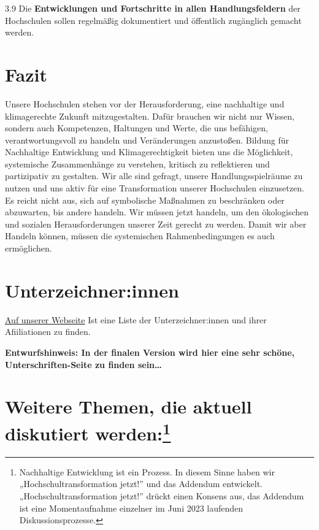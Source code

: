 \documentclass[DIV=12]{scrartcl}
\begin{document}
3.9 Die \textbf{Entwicklungen und Fortschritte in allen
Handlungsfeldern} der Hochschulen sollen regelmäßig dokumentiert und
öffentlich zugänglich gemacht werden.

\hypertarget{fazit}{%
\section{Fazit}\label{fazit}}

Unsere Hochschulen stehen vor der Herausforderung, eine nachhaltige und
klimagerechte Zukunft mitzugestalten. Dafür brauchen wir nicht nur
Wissen, sondern auch Kompetenzen, Haltungen und Werte, die uns
befähigen, verantwortungsvoll zu handeln und Veränderungen anzustoßen.
Bildung für Nachhaltige Entwicklung und Klimagerechtigkeit bieten uns
die Möglichkeit, systemische Zusammenhänge zu verstehen, kritisch zu
reflektieren und partizipativ zu gestalten. Wir alle sind gefragt,
unsere Handlungsspielräume zu nutzen und uns aktiv für eine
Transformation unserer Hochschulen einzusetzen. Es reicht nicht aus,
sich auf symbolische Maßnahmen zu beschränken oder abzuwarten, bis
andere handeln. Wir müssen jetzt handeln, um den ökologischen und
sozialen Herausforderungen unserer Zeit gerecht zu werden. Damit wir
aber Handeln können, müssen die systemischen Rahmenbedingungen es auch
ermöglichen.

\hypertarget{unterzeichnerinnen}{
\section*{Unterzeichner:innen}\label{unterzeichnerinnen}}

\href{https://hochschultransformation.jetzt/unterzeichnende.html}{\underline{Auf unserer Webseite}} Ist eine Liste der Unterzeichner:innen
und ihrer Afiiliationen zu finden.

\textbf{Entwurfshinweis: In der finalen Version wird hier eine sehr schöne, Unterschriften-Seite zu finden sein…}

\newpage

\hypertarget{weitere-themen-die-aktuell-diskutiert-werden1}{%
\section*{Weitere Themen, die aktuell diskutiert
werden:\footnote{Nachhaltige Entwicklung ist ein Prozess. In diesem Sinne
  haben wir „Hochschultransformation jetzt!'' und das Addendum
  entwickelt. „Hochschultransformation jetzt!'' drückt einen Konsens
  aus, das Addendum ist eine Momentaufnahme einzelner im Juni 2023
  laufenden Diskussionsprozesse.}}
 \label{weitere-themen-die-aktuell-diskutiert-werden1}}
\end{document}
